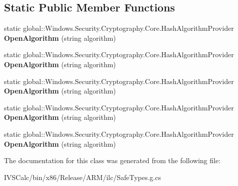 \subsection*{Static Public Member Functions}
\begin{DoxyCompactItemize}
\item 
\mbox{\label{class_windows_1_1_security_1_1_cryptography_1_1_core_1_1_hash_algorithm_provider_a27674a511171629a35e423ffe0beebd6}} 
static global\+::\+Windows.\+Security.\+Cryptography.\+Core.\+Hash\+Algorithm\+Provider {\bfseries Open\+Algorithm} (string algorithm)
\item 
\mbox{\label{class_windows_1_1_security_1_1_cryptography_1_1_core_1_1_hash_algorithm_provider_a27674a511171629a35e423ffe0beebd6}} 
static global\+::\+Windows.\+Security.\+Cryptography.\+Core.\+Hash\+Algorithm\+Provider {\bfseries Open\+Algorithm} (string algorithm)
\item 
\mbox{\label{class_windows_1_1_security_1_1_cryptography_1_1_core_1_1_hash_algorithm_provider_a27674a511171629a35e423ffe0beebd6}} 
static global\+::\+Windows.\+Security.\+Cryptography.\+Core.\+Hash\+Algorithm\+Provider {\bfseries Open\+Algorithm} (string algorithm)
\item 
\mbox{\label{class_windows_1_1_security_1_1_cryptography_1_1_core_1_1_hash_algorithm_provider_a27674a511171629a35e423ffe0beebd6}} 
static global\+::\+Windows.\+Security.\+Cryptography.\+Core.\+Hash\+Algorithm\+Provider {\bfseries Open\+Algorithm} (string algorithm)
\item 
\mbox{\label{class_windows_1_1_security_1_1_cryptography_1_1_core_1_1_hash_algorithm_provider_a27674a511171629a35e423ffe0beebd6}} 
static global\+::\+Windows.\+Security.\+Cryptography.\+Core.\+Hash\+Algorithm\+Provider {\bfseries Open\+Algorithm} (string algorithm)
\end{DoxyCompactItemize}


The documentation for this class was generated from the following file\+:\begin{DoxyCompactItemize}
\item 
I\+V\+S\+Calc/bin/x86/\+Release/\+A\+R\+M/ilc/Safe\+Types.\+g.\+cs\end{DoxyCompactItemize}
